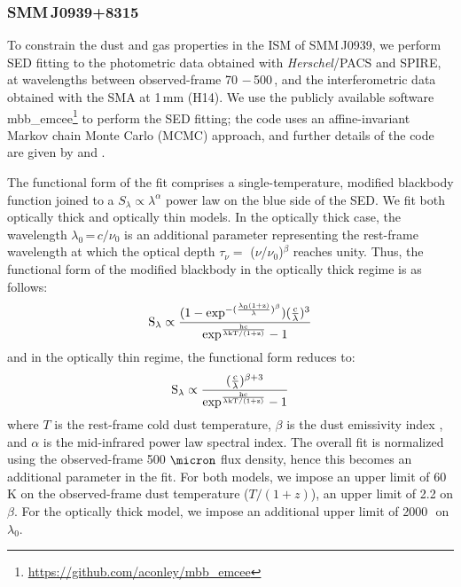 \documentclass[iop]{emulateapj}
\begin{document}
\subsubsection{SMM\,J0939+8315} \label{sec:SEDBg}
To constrain the dust and gas properties in the ISM of SMM\,J0939, we perform SED fitting to the
photometric data obtained with {\it Herschel}/PACS and SPIRE, at wavelengths
between observed-frame 70\,\micron\,$-$\,500\,\micron, and the interferometric data obtained with the SMA at 1\,mm (H14). We use the publicly
available software {\sc mbb\_emcee}\footnote{\url{https://github.com/aconley/mbb\_emcee}} to perform the SED fitting; the code uses an affine-invariant Markov chain Monte
Carlo (MCMC) approach, and further details of the code are given by \citet{Riechers13a} and \citet{Dowell14a}. \par
The
functional form of the fit comprises a single-temperature, modified blackbody function joined to a $S_{\lambda} \propto \lambda^\alpha
$ power law on the blue
side of the SED.
We fit both optically thick and optically thin models. In the optically thick case, the wavelength $
\lambda_0$\,=\,${c}/{\nu_0}$ is an additional parameter representing the rest-frame wavelength at which the optical
depth $\tau_{\nu} =$ ($\nu$/$\nu_0$)$^\beta$ reaches unity. Thus, the functional form of the modified blackbody
in the optically thick regime is as follows:
\begin{equation}
\rm S_{\lambda} \propto \frac{(1-exp^{-(\frac{\lambda_0 (1+z)}{\lambda})^{\beta}})(\frac{c}{\lambda})^3}
{exp^{\frac{hc}{\lambda\rm{kT/(1+z)} } }-1}
\end{equation}
and in the optically thin regime, the functional form reduces to:
\begin{equation}
\rm S_{\lambda} \propto \frac{(\frac{c}{\lambda})^{\beta+3}}{exp^{\frac{hc}{\lambda\rm{kT/(1+z)}}}-1}
\end{equation}
where $T$ is the rest-frame cold dust temperature, $\beta$ is the dust emissivity index 
, and $\alpha$ is the mid-infrared power law spectral index. The overall fit is normalized using the observed-frame 500
$\micron$ flux density, hence this becomes an additional parameter in the fit. For both models, we impose an upper limit of 60 K on the observed-frame dust temperature ($T/(1+z)$), an upper limit of 2.2 on
$\beta$. For the optically thick model, we impose an additional upper limit of 2000\,\micron\ on $\lambda_0$.
\end{document}
